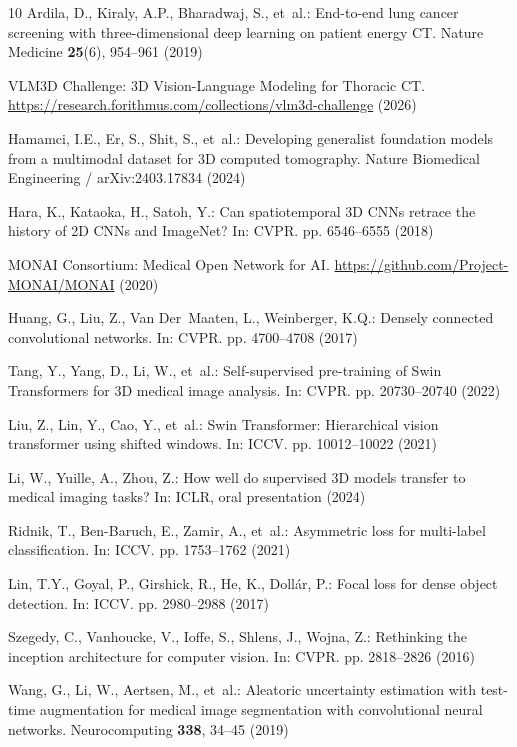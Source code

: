 \documentclass[runningheads]{llncs}
\begin{document}
\begin{thebibliography}{10}
Ardila, D., Kiraly, A.P., Bharadwaj, S., et~al.: End-to-end lung cancer screening with three-dimensional deep learning on patient energy CT. Nature Medicine \textbf{25}(6), 954--961 (2019)

VLM3D Challenge: 3D Vision-Language Modeling for Thoracic CT. \url{https://research.forithmus.com/collections/vlm3d-challenge} (2026)

Hamamci, I.E., Er, S., Shit, S., et~al.: Developing generalist foundation models from a multimodal dataset for 3D computed tomography. Nature Biomedical Engineering / arXiv:2403.17834 (2024)

Hara, K., Kataoka, H., Satoh, Y.: Can spatiotemporal 3D CNNs retrace the history of 2D CNNs and ImageNet? In: CVPR. pp. 6546--6555 (2018)

MONAI Consortium: Medical Open Network for AI. \url{https://github.com/Project-MONAI/MONAI} (2020)

Huang, G., Liu, Z., Van Der~Maaten, L., Weinberger, K.Q.: Densely connected convolutional networks. In: CVPR. pp. 4700--4708 (2017)

Tang, Y., Yang, D., Li, W., et~al.: Self-supervised pre-training of Swin Transformers for 3D medical image analysis. In: CVPR. pp. 20730--20740 (2022)

Liu, Z., Lin, Y., Cao, Y., et~al.: Swin Transformer: Hierarchical vision transformer using shifted windows. In: ICCV. pp. 10012--10022 (2021)

Li, W., Yuille, A., Zhou, Z.: How well do supervised 3D models transfer to medical imaging tasks? In: ICLR, oral presentation (2024)

Ridnik, T., Ben-Baruch, E., Zamir, A., et~al.: Asymmetric loss for multi-label classification. In: ICCV. pp. 1753--1762 (2021)

Lin, T.Y., Goyal, P., Girshick, R., He, K., Doll{\'a}r, P.: Focal loss for dense object detection. In: ICCV. pp. 2980--2988 (2017)

Szegedy, C., Vanhoucke, V., Ioffe, S., Shlens, J., Wojna, Z.: Rethinking the inception architecture for computer vision. In: CVPR. pp. 2818--2826 (2016)

Wang, G., Li, W., Aertsen, M., et~al.: Aleatoric uncertainty estimation with test-time augmentation for medical image segmentation with convolutional neural networks. Neurocomputing \textbf{338}, 34--45 (2019)
\end{thebibliography}
\end{document}
